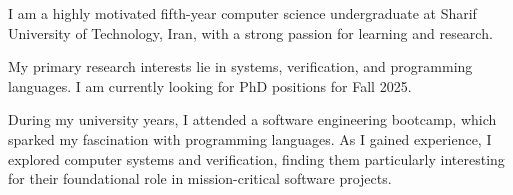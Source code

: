 

\begin{cvparagraph}

I am a highly motivated fifth-year computer science undergraduate at Sharif
University of Technology, Iran, with a strong passion for learning and research.

My primary research interests lie in systems, verification, and programming languages. I am currently looking for PhD positions for Fall 2025.

During my university years, I attended a software engineering bootcamp, which sparked my fascination with programming languages. As I gained experience, I explored computer systems and verification, finding them particularly interesting for their foundational role in mission-critical software projects.

\end{cvparagraph}
